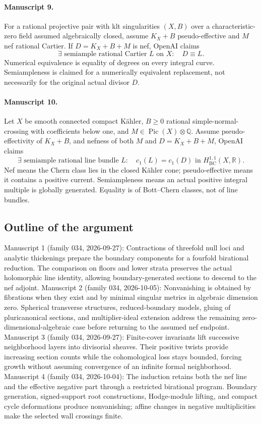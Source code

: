 \documentclass[11pt]{article}
\begin{document}
\paragraph{Manuscript 9.}
For a rational projective pair with klt singularities $(X,B)$ over a characteristic-zero field assumed algebraically closed, assume $K_X+B$ pseudo-effective and $M$ nef rational Cartier. If $D=K_X+B+M$ is nef, OpenAI claims
\[
\exists\text{ semiample rational Cartier }L\text{ on }X:\quad D\equiv L.
\]
Numerical equivalence is equality of degrees on every integral curve. Semiampleness is claimed for a numerically equivalent replacement, not necessarily for the original actual divisor $D$.

\paragraph{Manuscript 10.}
Let $X$ be smooth connected compact Kähler, $B\ge0$ rational simple-normal-crossing with coefficients below one, and $M\in\operatorname{Pic}(X)\otimes\mathbb Q$. Assume pseudo-effectivity of $K_X+B$, and nefness of both $M$ and $D=K_X+B+M$, OpenAI claims
\[
\exists\text{ semiample rational line bundle }L:\quad c_1(L)=c_1(D)\text{ in }H^{1,1}_{\mathrm{BC}}(X,\mathbb R).
\]
Nef means the Chern class lies in the closed Kähler cone; pseudo-effective means it contains a positive current. Semiampleness means an actual positive integral multiple is globally generated. Equality is of Bott--Chern classes, not of line bundles.

\subsection{Outline of the argument}
Manuscript 1 (family 034, 2026-09-27): Contractions of threefold null loci and analytic thickenings prepare the boundary components for a fourfold birational reduction. The comparison on floors and lower strata preserves the actual holomorphic line identity, allowing boundary-generated sections to descend to the nef adjoint. Manuscript 2 (family 034, 2026-10-05): Nonvanishing is obtained by fibrations when they exist and by minimal singular metrics in algebraic dimension zero. Spherical transverse structures, reduced-boundary models, gluing of pluricanonical sections, and multiplier-ideal extension address the remaining zero-dimensional-algebraic case before returning to the assumed nef endpoint. Manuscript 3 (family 034, 2026-09-27): Finite-cover invariants lift successive neighborhood layers into divisorial sheaves. Their positive twists provide increasing section counts while the cohomological loss stays bounded, forcing growth without assuming convergence of an infinite formal neighborhood. Manuscript 4 (family 034, 2026-10-04): The induction retains both the nef line and the effective negative part through a restricted birational program. Boundary generation, signed-support root constructions, Hodge-module lifting, and compact cycle deformations produce nonvanishing; affine changes in negative multiplicities make the selected wall crossings finite.
\end{document}
